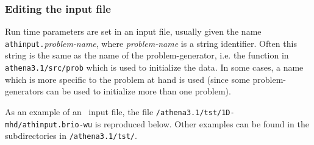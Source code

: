 \subsubsection{Editing the input file}

Run time parameters are set in an input file, usually given the name
{\tt athinput.}{\it problem-name}, where {\it problem-name} is a
string identifier.  Often this string is the same as the name of the
problem-generator, i.e. the function in {\tt athena3.1/src/prob} which
is used to initialize the data.  In some cases, a name which is more
specific to the problem at hand is used (since some problem-generators
can be used to initialize more than one problem).

As an example of an \ath\ input file, the file 
{\tt /athena3.1/tst/1D-mhd/athinput.brio-wu} is reproduced below.
Other examples can be found in the subdirectories in {\tt /athena3.1/tst/}.

